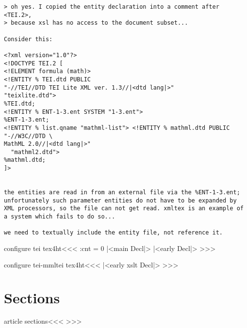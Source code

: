 {\begin{verbatim}
> oh yes. I copied the entity declaration into a comment after <TEI.2>,
> because xsl has no access to the document subset...

Consider this:

<?xml version="1.0"?>
<!DOCTYPE TEI.2 [
<!ELEMENT formula (math)>
<!ENTITY % TEI.dtd PUBLIC
"-//TEI//DTD TEI Lite XML ver. 1.3//|<dtd lang|>"
"teixlite.dtd">
%TEI.dtd;
<!ENTITY % ENT-1-3.ent SYSTEM "1-3.ent">
%ENT-1-3.ent;
<!ENTITY % list.qname "mathml-list"> <!ENTITY % mathml.dtd PUBLIC "-//W3C//DTD \
MathML 2.0//|<dtd lang|>"
  "mathml2.dtd">
%mathml.dtd;
]>


the entities are read in from an external file via the %ENT-1-3.ent;
unfortunately such parameter entities do not have to be expanded by
XML processors, so the file can not get read. xmltex is an example of
a system which fails to do so...

we need to textually include the entity file, not reference it.
\end{verbatim}


\<configure tei tex4ht\><<<
\HAssign\ent:cnt = 0
   {}
   {{\ifdim \lastskip>\z@ \unskip\fi
     \IgnorePar\parindent\z@ \leavevmode}%
     |<main Decl|>%
   } 
|<early Decl|>
>>>


\<configure tei-mmltei tex4ht\><<<
   {}
   {{\ifdim \lastskip>\z@ \unskip\fi
     \IgnorePar\parindent\z@ \leavevmode}%
   } 
|<early xslt Decl|>
>>>


\section{Sections}

\<article sections\><<<
   {}   {}
   {} {\CloseHead}
   {}   {}
   {}   {\CloseHead}
   {}   {}
   {}   {\CloseHead}
   {}   {}
   {}   {\CloseHead}
   {}   {}
   {}   {\CloseHead}
   {}   {}
   {}   {\CloseHead}
>>>




}
